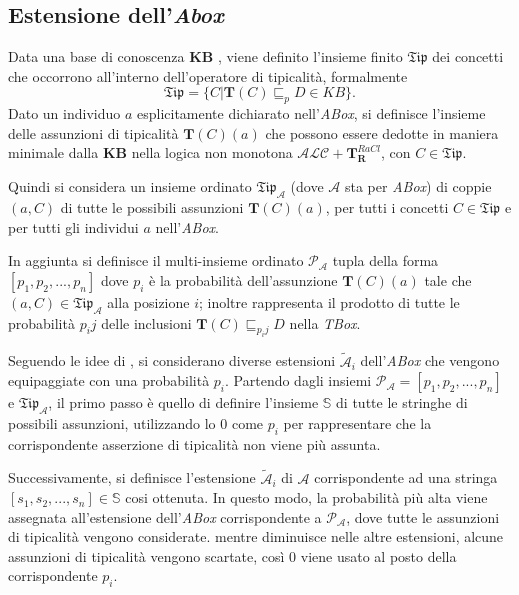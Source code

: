 \subsection{Estensione dell'\textit{Abox}}
Data una base di conoscenza \textbf{KB }, viene definito l’insieme finito $ \mathfrak{Tip} $ dei concetti che
occorrono all'interno dell'operatore di tipicalità, formalmente
\[ \mathfrak{Tip} = \{ C | \mathbf{T}(C) \sqsubseteq_{p} D \in KB \}. \]
Dato un individuo $ a $ esplicitamente dichiarato nell'\textit{ABox}, si definisce l’insieme delle
assunzioni di tipicalità $ \mathbf{T}(C)(a) $ che possono essere dedotte in maniera minimale dalla \textbf{KB}
nella logica non monotona $ \mathcal{ALC} + \mathbf{T}_{\mathbf{R}}^{\mathit{RaCl}} $, con $C \in \mathfrak{Tip}$.

Quindi si considera un insieme ordinato $ \mathfrak{Tip}_{\mathcal{A}}$ (dove $ \mathcal{A} $ sta per \textit{ABox})
di coppie $ (a, C) $ di tutte le possibili assunzioni $ \mathbf{T}(C)(a) $, 
per tutti i concetti $ C \in \mathfrak{Tip} $ e per tutti gli individui $ a $ nell'\textit{ABox}.

In aggiunta si definisce il multi-insieme ordinato $ \mathcal{P_{A}}$ tupla della forma $[p_1,p_2,...,p_n] $
dove $ p_i $ è la probabilità dell'assunzione $ \mathbf{T}(C)(a) $ tale che $ (a,C) \in 
\mathfrak{Tip}_{\mathcal{A}} $ alla posizione $ i $; inoltre rappresenta il prodotto di tutte le probabilità 
$ p_ij $ delle inclusioni $ \mathbf{T}(C) \sqsubseteq_{p_ij} D $ nella \textit{TBox}.

Seguendo le idee di \cite{ReasoningOnScen}, si considerano diverse estensioni $ \mathcal{\widetilde{A}}_i $
dell'\textit{ABox} che vengono equipaggiate con una probabilità $ p_i $. Partendo dagli insiemi  
$ \mathcal{P_{A}} = [p_1,p_2,...,p_n] $ e $ \mathfrak{Tip}_{\mathcal{A}}$, il primo passo è quello 
di definire l'insieme $ \mathbb{S} $ di tutte le stringhe di possibili assunzioni, utilizzando lo 0 come $ p_i $ per rappresentare che la corrispondente asserzione di tipicalità non viene più assunta.

Successivamente, si definisce l’estensione $ \mathcal{\widetilde{A}}_i $ di $ \mathcal{{A}} $ 
corrispondente ad una stringa $ [s_1,s_2,...,s_n] \in \mathbb{S} $ cosi ottenuta. 
In questo modo, la probabilità più alta viene assegnata all'estensione dell'\textit{ABox} corrispondente a 
$ \mathcal{P_{A}} $, dove tutte le assunzioni di tipicalità vengono considerate.
mentre diminuisce nelle altre estensioni, alcune assunzioni di tipicalità vengono scartate, 
così 0 viene usato al posto della corrispondente $ p_i $.

